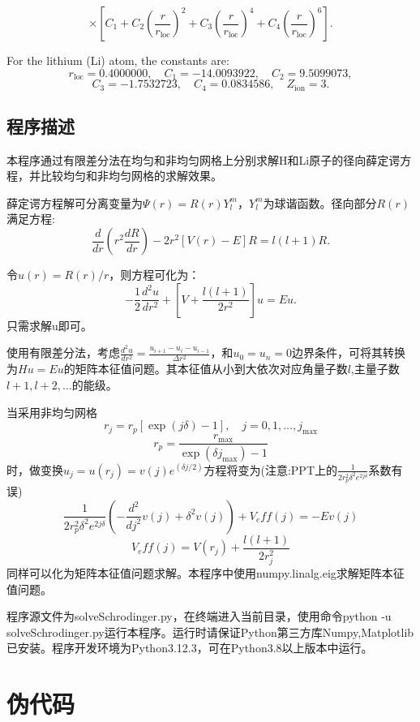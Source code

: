 \documentclass[11pt]{article}
\begin{document}
\[
\times \left[ C_1 + C_2 \left( \frac{r}{r_{\text{loc}}} \right)^2
+ C_3 \left( \frac{r}{r_{\text{loc}}} \right)^4
+ C_4 \left( \frac{r}{r_{\text{loc}}} \right)^6 \right].
\]

For the lithium (Li) atom, the constants are:
\[
r_{\text{loc}} = 0.4000000, \quad C_1 = -14.0093922, \quad C_2 = 9.5099073, 
\]
\[
C_3 = -1.7532723, \quad C_4 = 0.0834586, \quad Z_{\text{ion}} = 3.
\]


\subsection{程序描述}
本程序通过有限差分法在均匀和非均匀网格上分别求解H和Li原子的径向薛定谔方程，并比较均匀和非均匀网格的求解效果。

薛定谔方程解可分离变量为$\Psi(r)=R(r)Y_l^m$，$Y_l^m$为球谐函数。径向部分$R(r)$满足方程:
\[
\frac{d}{dr} \left( r^2 \frac{dR}{dr} \right) - 2r^2 \left[ V(r) - E \right] R = l(l+1) R.
\]

令$u(r) = R(r)/r$，则方程可化为：
\[
-\frac{1}{2}\frac{d^2 u}{dr^2} + \left[ V + \frac{l(l+1)}{2 r^2} \right] u = E u.
\]
只需求解u即可。

使用有限差分法，考虑$\frac{d^2u}{dr^2}=\frac{u_{i+1}-u_i-u_{i-1}}{ \Delta r^2}$，和$u_0=u_n=0$边界条件，可将其转换为$Hu=Eu$的矩阵本征值问题。其本征值从小到大依次对应角量子数$l$,主量子数$l+1,l+2,...$的能级。

当采用非均匀网格
\[
r_j = r_p \left[\exp(j\delta) - 1\right], \quad j = 0, 1, \ldots, j_{\text{max}}
\]
\[
r_p = \frac{r_{\text{max}}}{\exp(\delta j_{\text{max}}) - 1}
\]
时，做变换$u_j=u(r_j)=v(j)e^(\delta j/2)$方程将变为(注意:PPT上的$\frac{1}{2 r_p^2\delta^2 e^{2j\delta}}$系数有误)
\[
\frac{1}{2 r_p^2\delta^2 e^{2j\delta}}(-\frac{d^2}{dj^2}v(j)+\delta^2 v(j))+V_eff(j)=-E v(j)
\]
\[
V_eff(j)=V(r_j)+\frac{l(l+1)}{2 r_j^2}
\]
同样可以化为矩阵本征值问题求解。本程序中使用numpy.linalg.eig求解矩阵本征值问题。




程序源文件为solveSchrodinger.py，在终端进入当前目录，使用命令python -u solveSchrodinger.py运行本程序。运行时请保证Python第三方库Numpy,Matplotlib已安装。程序开发环境为Python3.12.3，可在Python3.8以上版本中运行。

\section{伪代码}
\end{document}
